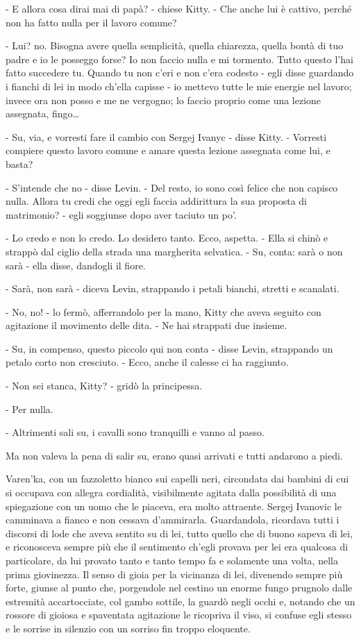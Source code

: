 - E allora cosa dirai mai di papà? - chiese Kitty. - Che anche lui è cattivo, perché non ha fatto nulla per il lavoro comune? 

- Lui? no. Bisogna avere quella semplicità, quella chiarezza, quella bontà di tuo padre e io le posseggo forse? Io non faccio nulla e mi tormento. Tutto questo l'hai fatto succedere tu. Quando tu non c'eri e non c'era codesto - egli disse guardando i fianchi di lei in modo ch'ella capisse - io mettevo tutte le mie energie nel lavoro; invece ora non posso e me ne vergogno; lo faccio proprio come una lezione assegnata, fingo\ldots{} 

- Su, via, e vorresti fare il cambio con Sergej Ivanyc - disse Kitty. - Vorresti compiere questo lavoro comune e amare questa lezione assegnata come lui, e basta? 

- S'intende che no - disse Levin. - Del resto, io sono così felice che non capisco nulla. Allora tu credi che oggi egli faccia addirittura la sua proposta di matrimonio? - egli soggiunse dopo aver taciuto un po'. 

- Lo credo e non lo credo. Lo desidero tanto. Ecco, aspetta. - Ella si chinò e strappò dal ciglio della strada una margherita selvatica. - Su, conta: sarà o non sarà - ella disse, dandogli il fiore. 

- Sarà, non sarà - diceva Levin, strappando i petali bianchi, stretti e scanalati. 

- No, no! - lo fermò, afferrandolo per la mano, Kitty che aveva seguito con agitazione il movimento delle dita. - Ne hai strappati due insieme. 

- Su, in compenso, questo piccolo qui non conta - disse Levin, strappando un petalo corto non cresciuto. - Ecco, anche il calesse ci ha raggiunto. 

- Non sei stanca, Kitty? - gridò la principessa. 

- Per nulla. 

- Altrimenti sali su, i cavalli sono tranquilli e vanno al passo. 

Ma non valeva la pena di salir su, erano quasi arrivati e tutti andarono a piedi. 

\label{iv-5} 

Varen'ka, con un fazzoletto bianco sui capelli neri, circondata dai bambini di cui si occupava con allegra cordialità, visibilmente agitata dalla possibilità di una spiegazione con un uomo che le piaceva, era molto attraente. Sergej Ivanovic le camminava a fianco e non cessava d'ammirarla. Guardandola, ricordava tutti i discorsi di lode che aveva sentito su di lei, tutto quello che di buono sapeva di lei, e riconosceva sempre più che il sentimento ch'egli provava per lei era qualcosa di particolare, da lui provato tanto e tanto tempo fa e solamente una volta, nella prima giovinezza. Il senso di gioia per la vicinanza di lei, divenendo sempre più forte, giunse al punto che, porgendole nel cestino un enorme fungo prugnolo dalle estremità accartocciate, col gambo sottile, la guardò negli occhi e, notando che un rossore di gioiosa e spaventata agitazione le ricopriva il viso, si confuse egli stesso e le sorrise in silenzio con un sorriso fin troppo eloquente. 

